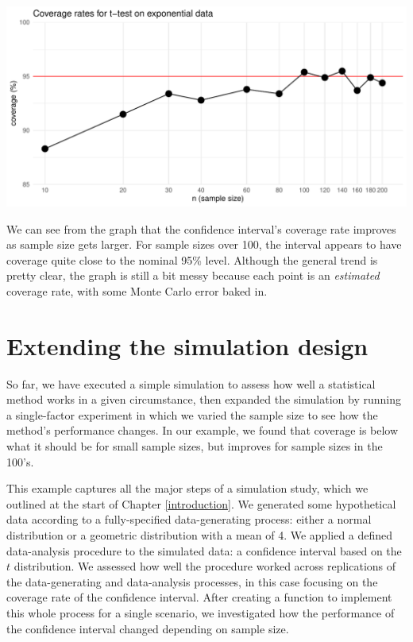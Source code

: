 \documentclass[
]{book}
\begin{document}
\begin{center}\includegraphics[width=0.75\linewidth]{Designing-Simulations-in-R_files/figure-latex/ttest_result_figure-1} \end{center}

We can see from the graph that the confidence interval's coverage rate improves as sample size gets larger. For sample sizes over 100, the interval appears to have coverage quite close to the nominal 95\% level.
Although the general trend is pretty clear, the graph is still a bit messy because each point is an \emph{estimated} coverage rate, with some Monte Carlo error baked in.

\section{Extending the simulation design}\label{extending-the-simulation-design}

So far, we have executed a simple simulation to assess how well a statistical method works in a given circumstance, then expanded the simulation by running a single-factor experiment in which we varied the sample size to see how the method's performance changes.
In our example, we found that coverage is below what it should be for small sample sizes, but improves for sample sizes in the 100's.

This example captures all the major steps of a simulation study, which we outlined at the start of Chapter \ref{introduction}.
We generated some hypothetical data according to a fully-specified data-generating process: either a normal distribution or a geometric distribution with a mean of 4.
We applied a defined data-analysis procedure to the simulated data: a confidence interval based on the \(t\) distribution.
We assessed how well the procedure worked across replications of the data-generating and data-analysis processes, in this case focusing on the coverage rate of the confidence interval.
After creating a function to implement this whole process for a single scenario, we investigated how the performance of the confidence interval changed depending on sample size.
\end{document}

